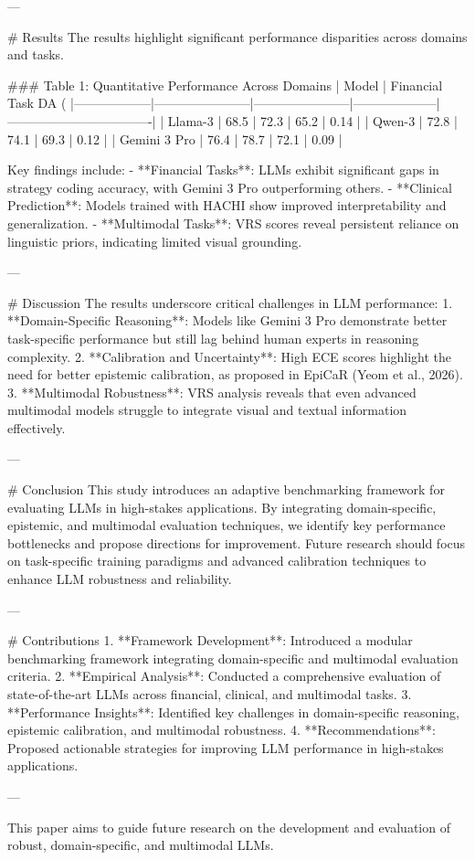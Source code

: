 ---

# Results  
The results highlight significant performance disparities across domains and tasks.

### Table 1: Quantitative Performance Across Domains  
| Model           | Financial Task DA (%
|------------------|-----------------------|-----------------------|--------------------|----------------------------------|  
| Llama-3         | 68.5                 | 72.3                 | 65.2              | 0.14                             |  
| Qwen-3          | 72.8                 | 74.1                 | 69.3              | 0.12                             |  
| Gemini 3 Pro    | 76.4                 | 78.7                 | 72.1              | 0.09                             |  

Key findings include:  
- **Financial Tasks**: LLMs exhibit significant gaps in strategy coding accuracy, with Gemini 3 Pro outperforming others.  
- **Clinical Prediction**: Models trained with HACHI show improved interpretability and generalization.  
- **Multimodal Tasks**: VRS scores reveal persistent reliance on linguistic priors, indicating limited visual grounding.

---

# Discussion  
The results underscore critical challenges in LLM performance:  
1. **Domain-Specific Reasoning**: Models like Gemini 3 Pro demonstrate better task-specific performance but still lag behind human experts in reasoning complexity.  
2. **Calibration and Uncertainty**: High ECE scores highlight the need for better epistemic calibration, as proposed in EpiCaR (Yeom et al., 2026).  
3. **Multimodal Robustness**: VRS analysis reveals that even advanced multimodal models struggle to integrate visual and textual information effectively.

---

# Conclusion  
This study introduces an adaptive benchmarking framework for evaluating LLMs in high-stakes applications. By integrating domain-specific, epistemic, and multimodal evaluation techniques, we identify key performance bottlenecks and propose directions for improvement. Future research should focus on task-specific training paradigms and advanced calibration techniques to enhance LLM robustness and reliability.

---

# Contributions  
1. **Framework Development**: Introduced a modular benchmarking framework integrating domain-specific and multimodal evaluation criteria.  
2. **Empirical Analysis**: Conducted a comprehensive evaluation of state-of-the-art LLMs across financial, clinical, and multimodal tasks.  
3. **Performance Insights**: Identified key challenges in domain-specific reasoning, epistemic calibration, and multimodal robustness.  
4. **Recommendations**: Proposed actionable strategies for improving LLM performance in high-stakes applications.  

---

This paper aims to guide future research on the development and evaluation of robust, domain-specific, and multimodal LLMs.
